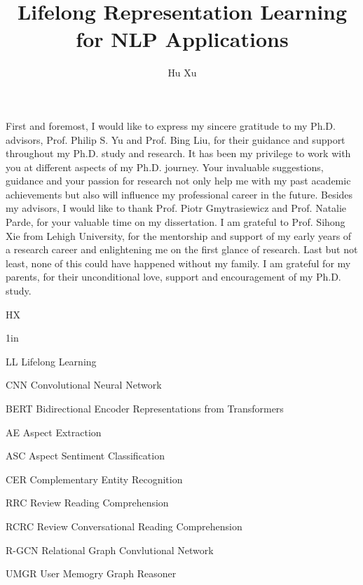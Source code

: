 \documentclass{uicthesi}
\begin{document}
\title{Lifelong Representation Learning for NLP Applications}
\author{Hu Xu}
\pdegrees{}
\maketitle


\acknowledgements
{First and foremost, I would like to express my sincere gratitude to my Ph.D. advisors, Prof. Philip
S. Yu and Prof. Bing Liu, for their guidance and support throughout my Ph.D. study and research. 
It has been my privilege to work with you at different aspects of my Ph.D. journey. 
Your invaluable suggestions, guidance and your passion for research not only help me with my past academic achievements but also will influence
my professional career in the future.
Besides my advisors, I would like to thank Prof. Piotr Gmytrasiewicz and Prof. Natalie Parde, for your valuable time on my dissertation.
I am grateful to Prof. Sihong Xie from Lehigh University, for the mentorship and support of my early years of a research career and enlightening me on the first glance of research. 
Last but not least, none of this could have happened without my family. I am grateful for my parents, for their unconditional love, support and encouragement of my Ph.D. study.\\

\begin{flushright}HX\end{flushright}}

\tableofcontents
\listoftables
\listoffigures
\listofabbreviations
\begin{list}
{}
{\setlength
  {}{1in}
    \setlength{\leftmargin}{1.5in}
    \setlength{\labelsep}{.5in}
    \setlength{\rightmargin}{\leftmargin}}
\item[LL\hfill] Lifelong Learning
\item[CNN\hfill] Convolutional Neural Network
\item[BERT\hfill] Bidirectional Encoder Representations from Transformers
\item[AE\hfill] Aspect Extraction
\item[ASC\hfill] Aspect Sentiment Classification
\item[CER\hfill] Complementary Entity Recognition
\item[RRC\hfill] Review Reading Comprehension
\item[RCRC\hfill] Review Conversational Reading Comprehension
\item[R-GCN\hfill] Relational Graph Convlutional Network
\item[UMGR\hfill] User Memogry Graph Reasoner
\end{list}
\end{document}
